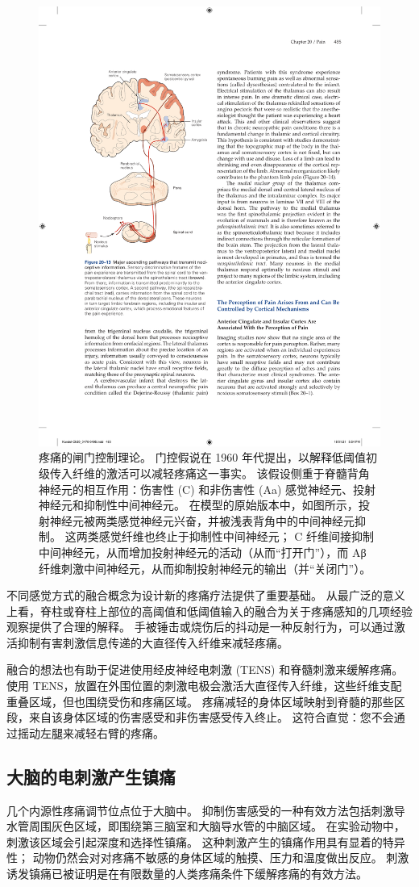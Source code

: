 \begin{figure}[htbp]
	\centering
	\includegraphics[width=0.7\linewidth]{chap20/fig_20_13}
	\caption{疼痛的闸门控制理论。 
		门控假说在 1960 年代提出，以解释低阈值初级传入纤维的激活可以减轻疼痛这一事实。 该假设侧重于脊髓背角神经元的相互作用：伤害性 (C) 和非伤害性 (Aa) 感觉神经元、投射神经元和抑制性中间神经元。 
		在模型的原始版本中，如图所示，投射神经元被两类感觉神经元兴奋，并被浅表背角中的中间神经元抑制。 
		这两类感觉纤维也终止于抑制性中间神经元； C 纤维间接抑制中间神经元，从而增加投射神经元的活动（从而“打开门”），而 Aβ 纤维刺激中间神经元，从而抑制投射神经元的输出（并“关闭门”）。}
	\label{fig:20_16}
\end{figure}

不同感觉方式的融合概念为设计新的疼痛疗法提供了重要基础。 
从最广泛的意义上看，脊柱或脊柱上部位的高阈值和低阈值输入的融合为关于疼痛感知的几项经验观察提供了合理的解释。 
手被锤击或烧伤后的抖动是一种反射行为，可以通过激活抑制有害刺激信息传递的大直径传入纤维来减轻疼痛。


融合的想法也有助于促进使用经皮神经电刺激 (TENS) 和脊髓刺激来缓解疼痛。 
使用 TENS，放置在外围位置的刺激电极会激活大直径传入纤维，这些纤维支配重叠区域，但也围绕受伤和疼痛区域。 
疼痛减轻的身体区域映射到脊髓的那些区段，来自该身体区域的伤害感受和非伤害感受传入终止。 
这符合直觉：您不会通过摇动左腿来减轻右臂的疼痛。


\subsection{大脑的电刺激产生镇痛}
几个内源性疼痛调节位点位于大脑中。 
抑制伤害感受的一种有效方法包括刺激导水管周围灰色区域，即围绕第三脑室和大脑导水管的中脑区域。 
在实验动物中，刺激该区域会引起深度和选择性镇痛。 
这种刺激产生的镇痛作用具有显着的特异性； 动物仍然会对对疼痛不敏感的身体区域的触摸、压力和温度做出反应。 
刺激诱发镇痛已被证明是在有限数量的人类疼痛条件下缓解疼痛的有效方法。


